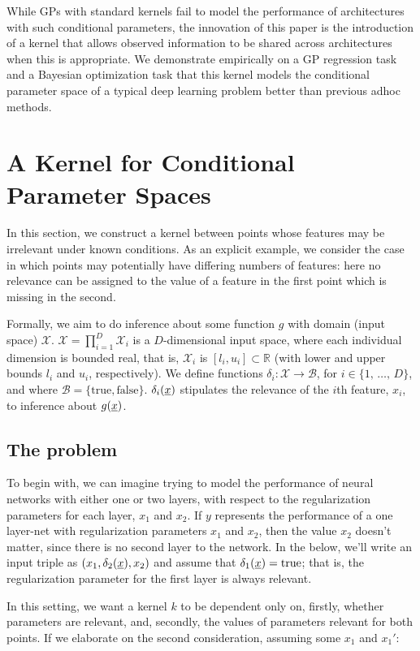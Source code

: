 \documentclass{article}
\newcommand{\vect}[1]{\underline{\smash{#1}}}
\renewcommand{\v}[1]{\vect{#1}}
\newcommand{\reals}{\mathds{R}}
\newcommand{\sX}{\mathcal{X}}
\begin{document}
While GPs with standard kernels fail to model the performance of architectures with such conditional parameters, the innovation of this paper is the introduction of a kernel that allows observed information to be shared across architectures when this is appropriate. We demonstrate empirically on a GP regression task and a Bayesian optimization task that this kernel models the conditional parameter space of a typical deep learning problem better than previous adhoc methods. 


\section{A Kernel for Conditional Parameter Spaces}
In this section, we construct a kernel between points whose features may be irrelevant under known conditions. As an explicit example, we consider the case in which points may potentially have differing numbers of features: here no relevance can be assigned to the value of a feature in the first point which is missing in the second. 

Formally, we aim to do inference about some function $g$ with domain (input space) $\sX$. $\sX = \prod_{i=1}^D \sX_i$ is a $D$-dimensional input space, where each individual dimension is 
 bounded real, that is, $\sX_i$ is $[l_i, u_i] \subset \reals$ (with lower and upper bounds $l_i$ and $u_i$, respectively). We define functions $\delta_i\colon \sX\to \mathcal{B}$, for $i \in \{1,\,\ldots,\,D\}$, and where $\mathcal{B} = \{\text{true}, \text{false}\}$. $\delta_i(\v{x})$ stipulates the relevance of the $i$th feature, $x_i$, to inference about $g(\v{x})$. 

\subsection{The problem}
To begin with, we can imagine trying to model the performance of neural networks with either one or two layers, with respect to the regularization parameters for each layer, $x_1$ and $x_2$.  If $y$ represents the performance of a one layer-net with regularization parameters $x_1$ and $x_2$, then the value $x_2$ doesn't matter, since there is no second layer to the network. In the below, we'll write an input triple as $(x_1, \delta_2(\v{x}), x_2)$ and assume that $\delta_1(\v{x}) = \text{true}$; that is, the regularization parameter for the first layer is always relevant. 

In this setting, we want a kernel $k$ to be dependent only on, firstly, whether parameters are relevant, and, secondly, the values of parameters relevant for both points. If we elaborate on the second consideration, assuming some $x_1$ and $x_1'$:
\end{document}
